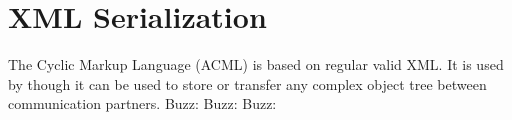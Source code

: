 \section{XML Serialization}
\label{feature:ACML}
\ClearAPI
The \AMBETH{} Cyclic Markup Language (ACML) is based on regular valid XML. It is used by  though it can be used to store or transfer any complex object tree between communication partners.
Buzz: 
Buzz: 
Buzz: 
\TODO